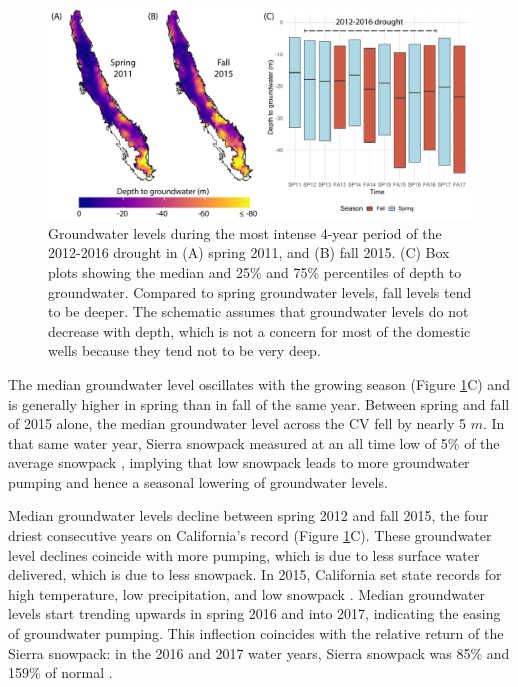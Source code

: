 \begin{figure}[ht]%
	\includegraphics[width=17.8 cm]{ch2_appendix_figs/erl_sp_fa_gwl.pdf}
	\caption{Groundwater levels during the most intense 4-year period of the 2012-2016 drought in (A) spring 2011, and (B) fall 2015. (C) Box plots showing the median and 25\% and 75\% percentiles of depth to groundwater. Compared to spring groundwater levels, fall levels tend to be deeper. The schematic assumes that groundwater levels do not decrease with depth, which is not a concern for most of the domestic wells because they tend not to be very deep.}
	\label{fig:sp_fall_gwl_2}
\end{figure}

The median groundwater level oscillates with the growing season (Figure \ref{fig:sp_fall_gwl_2}C) and is generally higher in spring than in fall of the same year. Between spring and fall of 2015 alone, the median groundwater level across the CV fell by nearly 5 $m$. In that same water year, Sierra snowpack measured at an all time low of 5\% of the average snowpack \cite{cadwr2017}, implying that low snowpack leads to more groundwater pumping and hence a seasonal lowering of groundwater levels. 

Median groundwater levels decline between spring 2012 and fall 2015, the four driest consecutive years on California's record (Figure \ref{fig:sp_fall_gwl_2}C). These groundwater level declines coincide with more pumping, which is due to less surface water delivered, which is due to less snowpack. In 2015, California set state records for high temperature, low precipitation, and low snowpack \cite{cadwr2017}. Median groundwater levels start trending upwards in spring 2016 and into 2017, indicating the easing of groundwater pumping. This inflection coincides with the relative return of the Sierra snowpack: in the 2016 and 2017 water years, Sierra snowpack was 85\% and 159\% of normal \cite{cadwr2016, cadwr2017}.  


